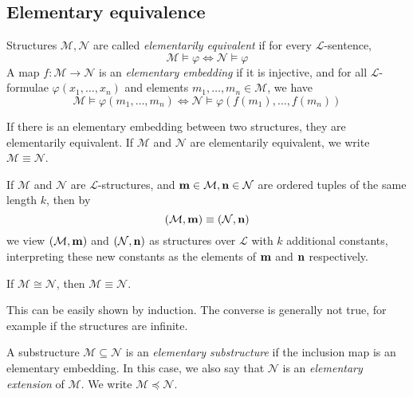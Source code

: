 \subsection{Elementary equivalence}
\begin{definition}
    Structures \( \mathcal M, \mathcal N \) are called \emph{elementarily equivalent} if for every \( \mathcal L \)-sentence,
    \[ \mathcal M \vDash \varphi \iff \mathcal N \vDash \varphi \]
    A map \( f : \mathcal M \to \mathcal N \) is an \emph{elementary embedding} if it is injective, and for all \( \mathcal L \)-formulae \( \varphi(x_1, \dots, x_n) \) and elements \( m_1, \dots, m_n \in \mathcal M \), we have
    \[ \mathcal M \vDash \varphi(m_1, \dots, m_n) \iff \mathcal N \vDash \varphi(f(m_1), \dots, f(m_n)) \]
\end{definition}
If there is an elementary embedding between two structures, they are elementarily equivalent.
If \( \mathcal M \) and \( \mathcal N \) are elementarily equivalent, we write \( \mathcal M \equiv \mathcal N \).
\begin{remark}
    If \( \mathcal M \) and \( \mathcal N \) are \( \mathcal L \)-structures, and \( \vb m \in \mathcal M, \vb n \in \mathcal N \) are ordered tuples of the same length \( k \), then by
    \[ (\mathcal M, \vb m) \equiv (\mathcal N, \vb n) \]
    we view \( (\mathcal M, \vb m) \) and \( (\mathcal N, \vb n) \) as structures over \( \mathcal L \) with \( k \) additional constants, interpreting these new constants as the elements of \( \vb m \) and \( \vb n \) respectively.
\end{remark}
\begin{proposition}
    If \( \mathcal M \cong \mathcal N \), then \( \mathcal M \equiv \mathcal N \).
\end{proposition}
This can be easily shown by induction.
The converse is generally not true, for example if the structures are infinite.
\begin{definition}
    A substructure \( \mathcal M \subseteq \mathcal N \) is an \emph{elementary substructure} if the inclusion map is an elementary embedding.
    In this case, we also say that \( \mathcal N \) is an \emph{elementary extension} of \( \mathcal M \).
    We write \( \mathcal M \preceq \mathcal N \).
\end{definition}

